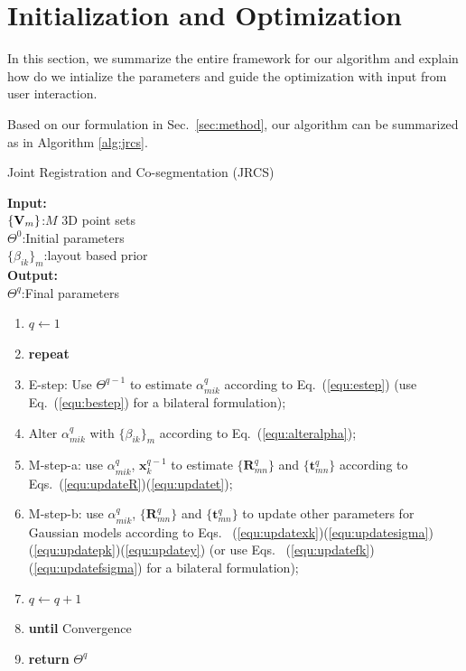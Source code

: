 \section{Initialization and Optimization}
\label{sec:imp}
In this section, we summarize the entire framework for our algorithm and explain how do we intialize the parameters and guide the optimization with input from user interaction.

Based on our formulation in Sec.~\ref{sec:method}, our algorithm can be summarized as in Algorithm \ref{alg:jrcs}.
\begin{algorithm}[htb]
	\caption{Joint Registration and Co-segmentation (JRCS)}
	\label{alg:jrcs}
	\textbf{Input:}~~\\
	$\{\mathbf{V}_m\}$:$M$ 3D point sets\\
	$\Theta^0$:Initial parameters\\
	$\{\beta_{ik}\}_{m}$:layout based prior\\
	\textbf{Output:}~~\\
	$\Theta^q$:Final parameters~~
	\begin{enumerate}
		\item $q\leftarrow1$
		\item \textbf{repeat}
		\item E-step: Use $\Theta^{q-1}$ to estimate $\alpha_{mik}^q$ according to Eq.~(\ref{equ:estep}) (use Eq.~(\ref{equ:bestep}) for a bilateral formulation);
		\item Alter $\alpha_{mik}^q$ with $\{\beta_{ik}\}_{m}$ according to Eq.~(\ref{equ:alteralpha});
		\item M-step-a: use $\alpha^q_{mik}$, $\mathbf x^{q-1}_k$ to estimate $\{\mathbf{R}_{mn}^q\}$ and $\{\mathbf t_{mn}^q\}$ according to Eqs.~(\ref{equ:updateR})(\ref{equ:updatet});
		\item M-step-b: use $\alpha^q_{mik}$, $\{\mathbf{R}_{mn}^q\}$ and $\{\mathbf{t}_{mn}^q\}$ to update other parameters for Gaussian models according to Eqs.~ (\ref{equ:updatexk})(\ref{equ:updatesigma})(\ref{equ:updatepk})(\ref{equ:updatey})  (or use Eqs.~ (\ref{equ:updatefk})(\ref{equ:updatefsigma}) for a bilateral formulation);
		\item $q \leftarrow q+1$
		\item \textbf{until} Convergence 
		\item \textbf{return} $\Theta^q$
	\end{enumerate}
\end{algorithm}
